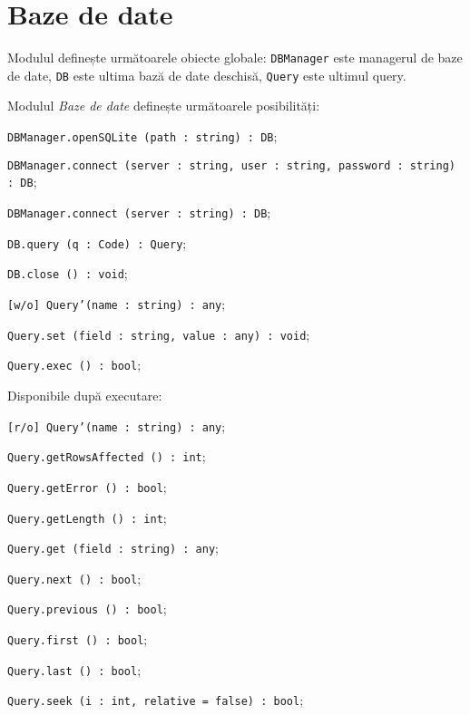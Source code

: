 \section{Baze de date}

Modulul definește următoarele obiecte globale: \texttt{DBManager} este managerul de baze de date, \texttt{DB} este ultima bază de date deschisă, \texttt{Query} este ultimul query.

Modulul \textit{Baze de date} definește următoarele posibilități:
\begin{icItems}
	\item \texttt{DBManager.openSQLite (path : string) : DB};
	\item \texttt{DBManager.connect (server : string, user : string, password : string) : DB};
	\item \texttt{DBManager.connect (server : string) : DB};
	\item \texttt{DB.query (q : Code) : Query};
	\item \texttt{DB.close () : void};
	\item \texttt{[w/o] Query'(name : string) : any};
	\item \texttt{Query.set (field : string, value : any) : void};
	\item \texttt{Query.exec () : bool};
	\item Disponibile după executare:
	\begin{icItems}
		\item \texttt{[r/o] Query'(name : string) : any};
		\item \texttt{Query.getRowsAffected () : int};
		\item \texttt{Query.getError () : bool};
		\item \texttt{Query.getLength () : int};
		\item \texttt{Query.get (field : string) : any};
		\item \texttt{Query.next () : bool};
		\item \texttt{Query.previous () : bool};
		\item \texttt{Query.first () : bool};
		\item \texttt{Query.last () : bool};
		\item \texttt{Query.seek (i : int, relative = false) : bool};
	\end{icItems}
\end{icItems}

